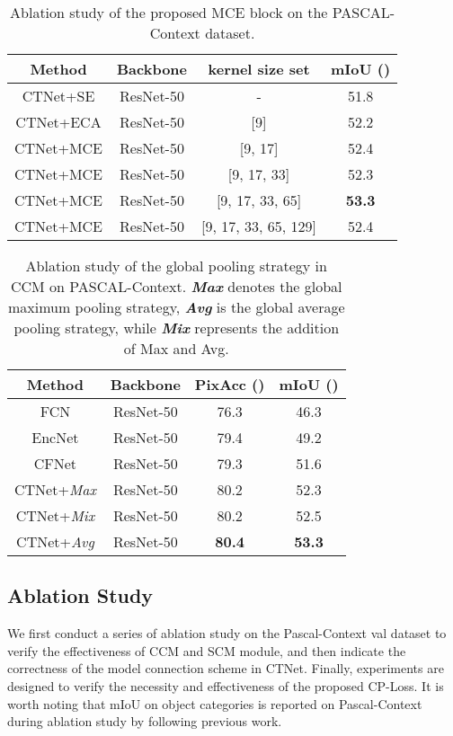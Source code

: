 \documentclass[10pt,journal,cspaper,compsoc]{IEEEtran}
\begin{document}
\begin{table}[t]
\centering
\caption{Ablation study of the proposed MCE block on the PASCAL-Context dataset.}
\label{table1}
\renewcommand\arraystretch{1.3}
\begin{tabular}{c|c|c||c}
			\hline
			Method & Backbone & kernel size set  & mIoU ()  \\
			\hline
			CTNet+SE \cite{hu2018squeeze} & ResNet-50 & - & 51.8 \\
			
			CTNet+ECA \cite{wang2020eca} & ResNet-50 & [9] & 52.2 \\
			\hline
			CTNet+MCE & ResNet-50 & [9, 17] & 52.4 \\
			
			CTNet+MCE & ResNet-50 & [9, 17, 33] & 52.3 \\
			
			CTNet+MCE & ResNet-50 & [9, 17, 33, 65] & \textbf{53.3} \\
			
			CTNet+MCE & ResNet-50 & [9, 17, 33, 65, 129] & 52.4 \\
\hline
\end{tabular}
\end{table}
	
	
\begin{table}[t]
\centering
\caption{Ablation study of the global pooling strategy in CCM on PASCAL-Context. \textbf{\textit{Max}} denotes the global maximum pooling strategy, \textbf{\textit{Avg}} is the global average pooling strategy, while \textbf{\textit{Mix}} represents the addition of Max and Avg.}
\label{table2}
		\renewcommand\arraystretch{1.3}
		\centering
		\begin{tabular}{c|c||c||c}
			\hline
			Method &Backbone &PixAcc () &mIoU ()\\
			\hline
			FCN \cite{shelhamer2017fully}  &   ResNet-50&   76.3 &46.3\\
			EncNet \cite{zhang2018context} &ResNet-50 & 79.4& 49.2\\
			CFNet \cite{zhang2019co}& ResNet-50& 79.3& 51.6\\
			\hline
			CTNet+\textit{Max} & ResNet-50& 80.2& 52.3\\
			CTNet+\textit{Mix} & ResNet-50& 80.2& 52.5\\
			CTNet+\textit{Avg} & ResNet-50& \textbf{80.4}& \textbf{53.3}\\
			\hline
	\end{tabular}
\end{table}
\subsection{Ablation Study}
We first conduct a series of ablation study on the Pascal-Context val dataset to verify the effectiveness of CCM and SCM module, and then indicate the correctness of the model connection scheme in CTNet. Finally, experiments are designed to verify the necessity and effectiveness of the proposed CP-Loss. It is worth noting that mIoU on  object categories is reported on Pascal-Context during ablation study by following previous work.
	
\end{document}
